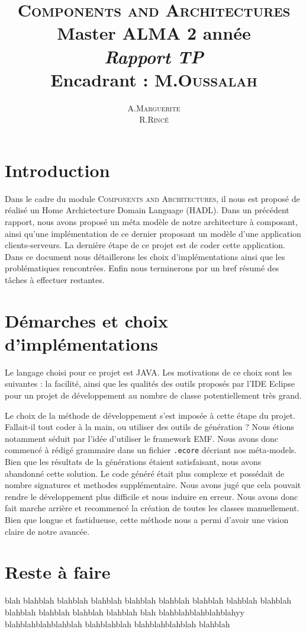\documentclass[12pt]{article}
\title{ {\huge \textsc{Components and Architectures}} \\  Master ALMA 2\up{eme} année  \\ \emph{Rapport TP}\\{\small Encadrant :  M.\textsc{Oussalah}}}
\author{A.\textsc{Marguerite} \\ R.\textsc{Rincé}}
\begin{document}
\maketitle
\renewcommand{\labelitemi}{$\bullet$} 



\section{Introduction}\label{sec:intro}
Dans le cadre du module \textsc{Components and Architectures}, il nous est proposé de réalisé un Home Archictecture Domain Language (HADL). Dans un précédent rapport, nous avons proposé un méta modèle de notre architecture à composant, ainsi qu'une implémentation de ce dernier proposant un modèle d'une application clients-serveurs. La dernière étape de ce projet est de coder cette application. Dans ce document nous détaillerons les choix d'implémentations ainsi que les problématiques rencontrées. Enfin nous terminerons par un bref résumé des tâches à effectuer restantes.
\section{Démarches et choix d'implémentations}\label{sec:pblm}
Le langage choisi pour ce projet est JAVA. Les motivations de ce choix sont les suivantes : la facilité, ainsi que les qualités des outils proposés par l'IDE Eclipse pour un projet de développement au nombre de classe potentiellement très grand. 

Le choix de la méthode de développement s'est imposée à cette étape du projet. Fallait-il tout coder à la main, ou utiliser des outils de génération ? Nous étions notamment séduit par l'idée d'utiliser le framework EMF. Nous avons donc commencé à rédigé grammaire dans un fichier \verb+.ecore+ décriant nos méta-models. Bien que les résultats de la générations étaient satisfaisant, nous avons abandonné cette solution. Le code généré était plus complexe et possédait de nombre signatures et methodes supplémentaire. Nous avons jugé que cela pouvait rendre le développement plus difficile et nous induire en erreur. Nous avons donc fait marche arrière et recommencé la création de toutes les classes manuellement. Bien que longue et fastidueuse, cette méthode nous a permi d'avoir une vision claire de notre avancée.


\section{Reste à faire}
blah blahblah blahblah blahblah blahblah blahblah blahblah blahblah blahblah blahblah blahblah blahblah blahblah blah
blahblahblahblahblahyy blahblahblahblahblah blahblahblah blahblahblahblah blahblah
\end{document}
